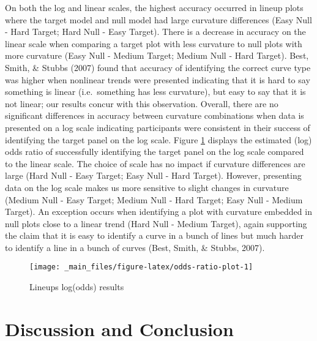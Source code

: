 \documentclass[print]{nuthesis}
\begin{document}
On both the log and linear scales, the highest accuracy occurred in lineup plots where the target model and null model had large curvature differences (Easy Null - Hard Target; Hard Null - Easy Target).
There is a decrease in accuracy on the linear scale when comparing a target plot with less curvature to null plots with more curvature (Easy Null - Medium Target; Medium Null - Hard Target).
Best, Smith, \& Stubbs (2007) found that accuracy of identifying the correct curve type was higher when nonlinear trends were presented indicating that it is hard to say something is linear (i.e.~something has less curvature), but easy to say that it is not linear; our results concur with this observation.
Overall, there are no significant differences in accuracy between curvature combinations when data is presented on a log scale indicating participants were consistent in their success of identifying the target panel on the log scale.
Figure \ref{fig:odds-ratio-plot} displays the estimated (log) odds ratio of successfully identifying the target panel on the log scale compared to the linear scale.
The choice of scale has no impact if curvature differences are large (Hard Null - Easy Target; Easy Null - Hard Target).
However, presenting data on the log scale makes us more sensitive to slight changes in curvature (Medium Null - Easy Target; Medium Null - Hard Target; Easy Null - Medium Target).
An exception occurs when identifying a plot with curvature embedded in null plots close to a linear trend (Hard Null - Medium Target), again supporting the claim that it is easy to identify a curve in a bunch of lines but much harder to identify a line in a bunch of curves (Best, Smith, \& Stubbs, 2007).

\begin{figure}

{\centering \texttt{[image: \_main\_files/figure-latex/odds-ratio-plot-1]} 

}

\caption{Lineups log(odds) results}\label{fig:odds-ratio-plot}
\end{figure}

\hypertarget{discussion-and-conclusion}{%
\section{Discussion and Conclusion}\label{discussion-and-conclusion}}
\end{document}
